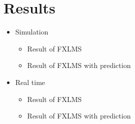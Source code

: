 \section{Results}
\begin{itemize}
\item Simulation
\begin{itemize}
\item Result of FXLMS
\item Result of FXLMS with prediction
\end{itemize}
\item Real time 
\begin{itemize}
\item Result of FXLMS
\item Result of FXLMS with prediction
\end{itemize}
\end{itemize}